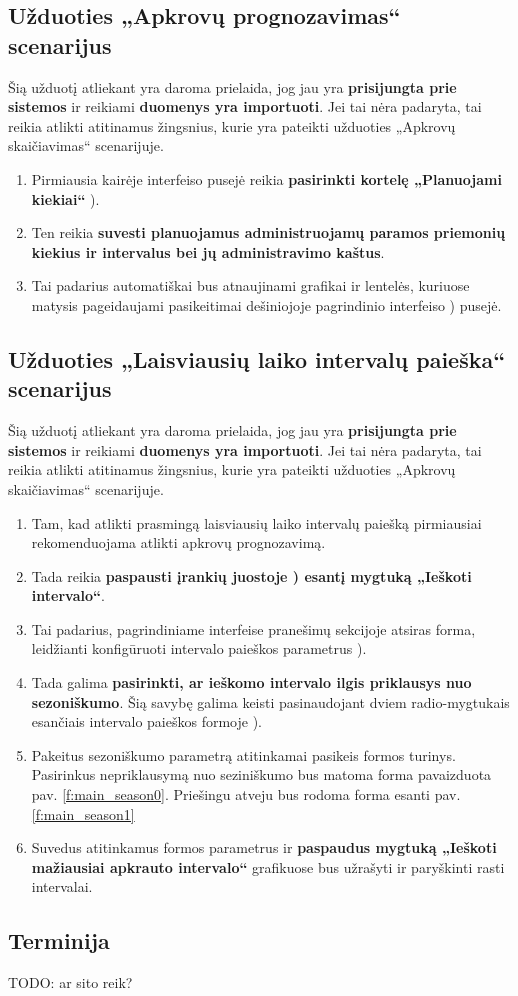 \subsection{Užduoties „Apkrovų prognozavimas“ scenarijus}
Šią užduotį atliekant yra daroma prielaida, jog jau yra \textbf{prisijungta prie sistemos} ir reikiami \textbf{duomenys yra importuoti}. Jei tai nėra padaryta, tai reikia atlikti atitinamus žingsnius, kurie yra pateikti užduoties „Apkrovų skaičiavimas“ scenarijuje.

\begin{enumerate}
  \item Pirmiausia kairėje interfeiso pusejė reikia \textbf{pasirinkti kortelę „Planuojami kiekiai“} ).
  \item Ten reikia \textbf{suvesti planuojamus administruojamų paramos priemonių kiekius ir intervalus bei jų administravimo kaštus}.
  \item Tai padarius automatiškai bus atnaujinami grafikai ir lentelės, kuriuose matysis pageidaujami pasikeitimai dešiniojoje pagrindinio interfeiso ) pusejė.
\end{enumerate}


\subsection{Užduoties „Laisviausių laiko intervalų paieška“ scenarijus}
Šią užduotį atliekant yra daroma prielaida, jog jau yra \textbf{prisijungta prie sistemos} ir reikiami \textbf{duomenys yra importuoti}. Jei tai nėra padaryta, tai reikia atlikti atitinamus žingsnius, kurie yra pateikti užduoties „Apkrovų skaičiavimas“ scenarijuje.

\begin{enumerate}
  \item Tam, kad atlikti prasmingą laisviausių laiko intervalų paiešką pirmiausiai rekomenduojama atlikti apkrovų prognozavimą.
  \item Tada reikia \textbf{paspausti įrankių juostoje ) esantį mygtuką „Ieškoti intervalo“}.
  \item Tai padarius, pagrindiniame interfeise pranešimų sekcijoje atsiras forma, leidžianti konfigūruoti intervalo paieškos parametrus ).
  \item Tada galima \textbf{pasirinkti, ar ieškomo intervalo ilgis priklausys nuo sezoniškumo}. Šią savybę galima keisti pasinaudojant dviem radio-mygtukais esančiais intervalo paieškos formoje ).
  \item Pakeitus sezoniškumo parametrą atitinkamai pasikeis formos turinys. Pasirinkus nepriklausymą nuo seziniškumo bus matoma forma pavaizduota pav. \ref{f:main_season0}. Priešingu atveju bus rodoma forma esanti pav. \ref{f:main_season1}
  \item Suvedus atitinkamus formos parametrus ir \textbf{paspaudus mygtuką „Ieškoti mažiausiai apkrauto intervalo“} grafikuose bus užrašyti ir paryškinti rasti intervalai.
\end{enumerate}


\subsection{Terminija}
TODO: ar sito reik?
